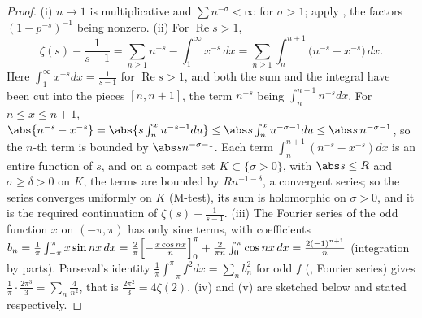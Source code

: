 \begin{proof}
(i) $n\mapsto1$ is multiplicative and $\sum n^{-\sigma}<\infty$ for $\sigma>1$; apply , the factors $(1-p^{-s})^{-1}$ being nonzero.
(ii) For $\operatorname{Re}s>1$,
\[
\zeta(s)-\frac1{s-1}=\sum_{n\ge1}n^{-s}-\int_1^\infty x^{-s}\,dx=\sum_{n\ge1}\int_n^{n+1}\bigl(n^{-s}-x^{-s}\bigr)\,dx .
\]
Here $\int_1^\infty x^{-s}dx=\frac1{s-1}$ for $\operatorname{Re}s>1$, and both the sum and the integral have been cut into the pieces $[n,n+1]$, the term $n^{-s}$ being
$\int_n^{n+1}n^{-s}dx$. For $n\le x\le n+1$, $\abs{n^{-s}-x^{-s}}=\abs{s\int_n^xu^{-s-1}du}\le\abs s\int_n^xu^{-\sigma-1}du\le\abs s\,n^{-\sigma-1}$, so the $n$-th term is bounded by
$\abs sn^{-\sigma-1}$. Each term $\int_n^{n+1}(n^{-s}-x^{-s})dx$ is an entire function of $s$, and on a compact set $K\subset\{\sigma>0\}$, with $\abs s\le R$ and $\sigma\ge\delta>0$ on
$K$, the terms are bounded by $Rn^{-1-\delta}$, a convergent series; so the series converges uniformly on $K$ (M-test), its sum is holomorphic on $\sigma>0$, and it is the
required continuation of $\zeta(s)-\frac1{s-1}$.
(iii) The Fourier series of the odd function $x$ on $(-\pi,\pi)$ has only sine terms, with coefficients
$b_n=\frac1\pi\int_{-\pi}^\pi x\sin nx\,dx=\frac2\pi\Bigl[-\frac{x\cos nx}n\Bigr]_0^\pi+\frac2{\pi n}\int_0^\pi\cos nx\,dx=\frac{2(-1)^{n+1}}n$ (integration by parts). Parseval's identity
$\frac1\pi\int_{-\pi}^\pi f^2dx=\sum_nb_n^2$ for odd $f$ (\cite{RHB06}, Fourier series) gives $\frac1\pi\cdot\frac{2\pi^3}3=\sum_n\frac4{n^2}$, that is $\frac{2\pi^2}3=4\zeta(2)$.
(iv) and (v) are sketched below and stated respectively.
\end{proof}

